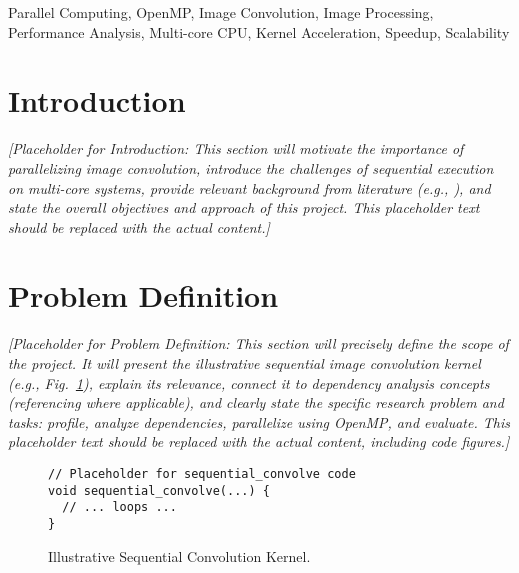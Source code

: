 \documentclass[conference, 10pt]{IEEEtran}
\begin{document}
\begin{IEEEkeywords}
Parallel Computing, OpenMP, Image Convolution, Image Processing, Performance Analysis, Multi-core CPU, Kernel Acceleration, Speedup, Scalability
\end{IEEEkeywords}


\section{Introduction}
\textit{{\color{blue} %
[Placeholder for Introduction: This section will motivate the importance of parallelizing image convolution, introduce the challenges of sequential execution on multi-core systems, provide relevant background from literature (e.g., \cite{trustmebro2025}), and state the overall objectives and approach of this project. This placeholder text should be replaced with the actual content.]
}}

\section{Problem Definition}
\textit{{\color{blue} %
[Placeholder for Problem Definition: This section will precisely define the scope of the project. It will present the illustrative sequential image convolution kernel (e.g., Fig.~\ref{fig:seq_code}), explain its relevance, connect it to dependency analysis concepts (referencing \cite{idkfactchecking2025} where applicable), and clearly state the specific research problem and tasks: profile, analyze dependencies, parallelize using OpenMP, and evaluate. This placeholder text should be replaced with the actual content, including code figures.]
}}

\begin{figure}[htbp]
\begin{verbatim}
// Placeholder for sequential_convolve code
void sequential_convolve(...) {
  // ... loops ...
}
\end{verbatim}
\caption{Illustrative Sequential Convolution Kernel.}
\label{fig:seq_code}
\end{figure}


\end{document}
